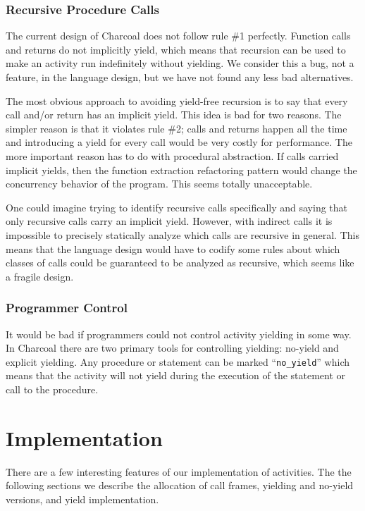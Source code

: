 \documentclass[10pt,preprint]{sigplanconf}
\begin{document}
\subsubsection{Recursive Procedure Calls}

The current design of Charcoal does not follow rule \#1 perfectly.
Function calls and returns do not implicitly yield, which means that recursion can be used to make an activity run indefinitely without yielding.
We consider this a bug, not a feature, in the language design, but we have not found any less bad alternatives.

The most obvious approach to avoiding yield-free recursion is to say that every call and/or return has an implicit yield.
This idea is bad for two reasons.
The simpler reason is that it violates rule \#2; calls and returns happen all the time and introducing a yield for every call would be very costly for performance.
The more important reason has to do with procedural abstraction.
If calls carried implicit yields, then the function extraction refactoring pattern would change the concurrency behavior of the program.
This seems totally unacceptable.

One could imagine trying to identify recursive calls specifically and saying that only recursive calls carry an implicit yield.
However, with indirect calls it is impossible to precisely statically analyze which calls are recursive in general.
This means that the language design would have to codify some rules about which classes of calls could be guaranteed to be analyzed as recursive, which seems like a fragile design.

\subsubsection{Programmer Control}

It would be bad if programmers could not control activity yielding in some way.
In Charcoal there are two primary tools for controlling yielding: no-yield and explicit yielding.
Any procedure or statement can be marked ``\texttt{no\_yield}'' which means that the activity will not yield during the execution of the statement or call to the procedure.

\section{Implementation}

There are a few interesting features of our implementation of activities.
The the following sections we describe the allocation of call frames, yielding and no-yield versions, and yield implementation.
\end{document}
